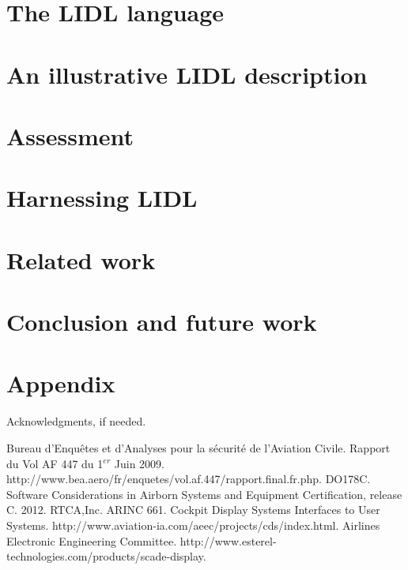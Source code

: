 \documentclass{sigplanconf}
\begin{document}
\section{The LIDL language}


\section{An illustrative LIDL description}


\section{Assessment}


\section{Harnessing  LIDL }


\section{Related work}


\section{Conclusion and future work}


\appendix

\section{Appendix}



\acks

Acknowledgments, if needed.





\begin{thebibliography}{}
\softraggedright
{} 
  Bureau d'Enqu\^etes et d'Analyses pour la s\'ecurit\'e de l'Aviation Civile. 
  Rapport du Vol AF 447 du 1$^{er}$ Juin 2009.
  http://www.bea.aero/fr/enquetes/vol.af.447/rapport.final.fr.php.
  DO178C. 
  Software Considerations in Airborn Systems and Equipment
  Certification, release C.
  2012.
  RTCA,Inc.
  ARINC 661.
  Cockpit Display Systems Interfaces to User Systems.
  http://www.aviation-ia.com/aeec/projects/cds/index.html.
  Airlines Electronic Engineering Committee.
  http://www.esterel-technologies.com/products/scade-display.


\end{thebibliography}
\end{document}

